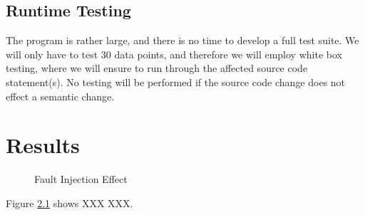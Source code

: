 \documentclass[10pt]{report}
\begin{document}
\section{Runtime Testing}

The program is rather large, and there is no time to develop a full test suite.  We will only have to test 30 data points, and therefore we will employ white box testing, where we will ensure to run through the affected source code statement(s).  No testing will be performed if the source code change does not effect a semantic change.

\chapter{Results}
\thispagestyle{fancy}

\begin{figure}[p]
    \centering
    \setlength\fboxsep{0pt}
    \setlength\fboxrule{0.5pt}
    \caption{Fault Injection Effect}
    \label{placeholder}
\end{figure}

Figure \ref{placeholder} shows XXX XXX.
\end{document}
